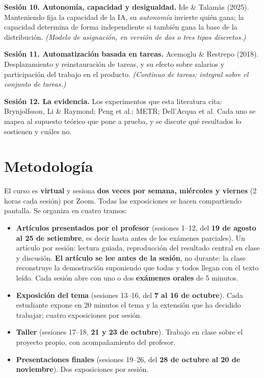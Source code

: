 \documentclass[11pt]{article}
\begin{document}
\textbf{Sesi\'on 10. Autonom\'ia, capacidad y desigualdad.}
Ide \& Talam\`as (2025). Manteniendo fija la capacidad de la IA, su \emph{autonom\'ia} invierte qui\'en gana; la capacidad determina de forma independiente si tambi\'en gana la base de la distribuci\'on.
\emph{(Modelo de asignaci\'on, en versi\'on de dos o tres tipos discretos.)}

\textbf{Sesi\'on 11. Automatizaci\'on basada en tareas.}
Acemoglu \& Restrepo (2018). Desplazamiento y reinstauraci\'on de tareas, y su efecto sobre salarios y participaci\'on del trabajo en el producto.
\emph{(Continuo de tareas; integral sobre el conjunto de tareas.)}

\textbf{Sesi\'on 12. La evidencia.}
Los experimentos que esta literatura cita: Brynjolfsson, Li \& Raymond; Peng et al.; METR; Dell'Acqua et al. Cada uno se mapea al supuesto te\'orico que pone a prueba, y se discute qu\'e resultados lo sostienen y cu\'ales no.

\section{Metodolog\'ia}

El curso es \textbf{virtual} y sesiona \textbf{dos veces por semana, mi\'ercoles y viernes} (2 horas cada sesi\'on) por Zoom. Todas las exposiciones se hacen compartiendo pantalla. Se organiza en cuatro tramos:

\begin{itemize}
\item \textbf{Art\'iculos presentados por el profesor} (sesiones 1--12, del \textbf{19 de agosto al 25 de setiembre}, es decir hasta antes de los ex\'amenes parciales). Un art\'iculo por sesi\'on: lectura guiada, reproducci\'on del resultado central en clase y discusi\'on. \textbf{El art\'iculo se lee antes de la sesi\'on}, no durante: la clase reconstruye la demostraci\'on suponiendo que todas y todos llegan con el texto le\'ido. Cada sesi\'on abre con uno o dos \textbf{ex\'amenes orales} de 5 minutos.
\item \textbf{Exposici\'on del tema} (sesiones 13--16, del \textbf{7 al 16 de octubre}). Cada estudiante expone en 20 minutos el tema y la extensi\'on que ha decidido trabajar; cuatro exposiciones por sesi\'on.
\item \textbf{Taller} (sesiones 17--18, \textbf{21 y 23 de octubre}). Trabajo en clase sobre el proyecto propio, con acompa\~namiento del profesor.
\item \textbf{Presentaciones finales} (sesiones 19--26, del \textbf{28 de octubre al 20 de noviembre}). Dos exposiciones por sesi\'on.
\end{itemize}
\end{document}
